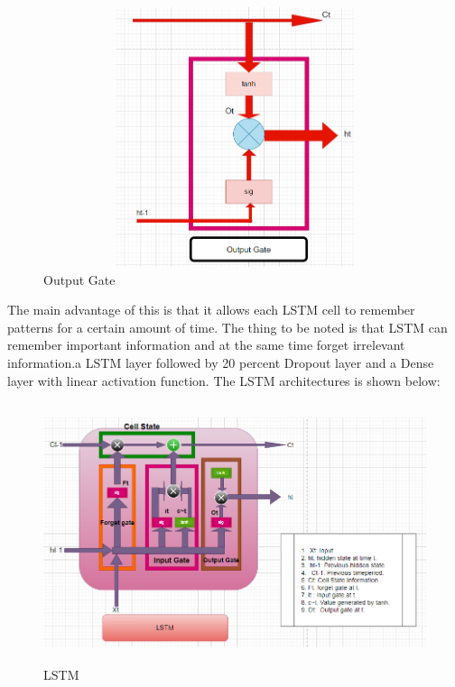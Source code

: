 \documentclass[openany,12pt]{report}
\begin{document}
\begin{itemize}
\begin{figure}[H]
\centering
\includegraphics[width=5in,height=3in]{./Output Gate.png}
\caption{Output Gate}
\end{figure}

The main advantage of this is that it allows each LSTM cell to
remember patterns for a certain amount of time. The thing to be
noted is that LSTM can remember important information and at
the same time forget irrelevant information.a LSTM layer followed by 20 percent Dropout
layer and a Dense layer with linear activation function. The LSTM
architectures is shown below:

\newline
\end{itemize}
\begin{figure}[H]
\centering
\includegraphics[width=5in,height=3in]{./LSTM Dig.png}
\caption{LSTM}
\end{figure}
\end{document}
